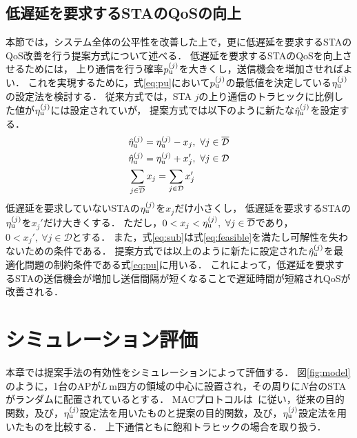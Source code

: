 \documentclass[twocolumn, a4paper]{ieicejsp}
\newcommand{\etau}{\eta_{\rm u}^{(j)}}
\begin{document}
	\subsection{低遅延を要求するSTAのQoSの向上}
		本節では，システム全体の公平性を改善した上で，更に低遅延を要求するSTAのQoS改善を行う提案方式について述べる．
		低遅延を要求するSTAのQoSを向上させるためには，
		上り通信を行う確率$p_{\rm u}^{(j)}$を大きくし，送信機会を増加させればよい．
		これを実現するために，式\eqref{eq:pu}において$p_{\rm u}^{(j)}$の最低値を決定している$\etau$の設定法を検討する．
		従来方式では，STA $j$の上り通信のトラヒックに比例した値が$\etau$には設定されていが，
		提案方式では以下のように新たな${\hat \eta}_{\rm u}^{(j)}$を設定する．
		\begin{align}
			&{\hat \eta}_{\rm u}^{(j)} = \etau -x_j,\ \forall j \in {\overline {\mathcal D}} \label{eq:etadbar}\\
			&{\hat \eta}_{\rm u}^{(j)} = \etau + x_j',\ \forall j \in {\mathcal D} \label{eq:etad}\\
			&\sum_{j\in{\overline {\mathcal D}}} x_j = \sum_{j\in{\mathcal D}} x_j' \label{eq:sub}
		\end{align}
		低遅延を要求していないSTAの$\etau$を$x_j$だけ小さくし，
		低遅延を要求するSTAの$\etau$を$x_j'$だけ大きくする．
		ただし，$0<x_j<\etau,\ \forall j\in{{\overline {\mathcal D}}}$であり，$0<x_j',\ \forall j\in{\mathcal D}$とする．
		また，式\eqref{eq:sub}は式\eqref{eq:feasible}を満たし可解性を失わないための条件である．
		提案方式では以上のように新たに設定された${\hat \eta}_{\rm u}^{(j)}$を最適化問題の制約条件である式\eqref{eq:pu}に用いる．
		これによって，低遅延を要求するSTAの送信機会が増加し送信間隔が短くなることで遅延時間が短縮されQoSが改善される．

\section{シミュレーション評価}
	本章では提案手法の有効性をシミュレーションによって評価する．
	図\ref{fig:model}のように，1台のAPが$L$\,m四方の領域の中心に設置され，その周りに$N$台のSTAがランダムに配置されているとする．
	MACプロトコルは~\cite{promac}に従い，従来の目的関数，及び，$\etau$設定法を用いたものと提案の目的関数，及び，$\etau$設定法を用いたものを比較する．
	上下通信ともに飽和トラヒックの場合を取り扱う．
\end{document}
